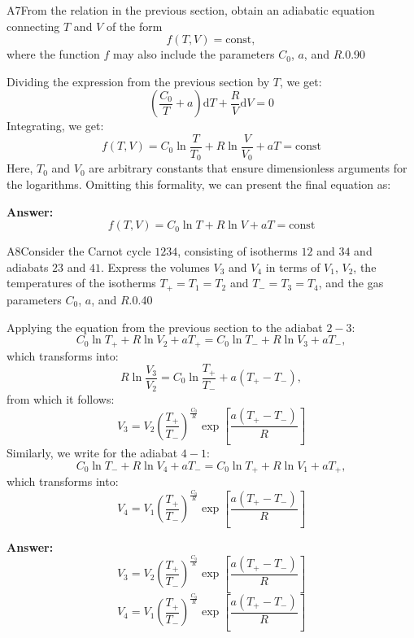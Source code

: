 \documentclass[11pt,a4paper]{article}
\begin{document}
\begin{solcard}{A7}{From the relation in the previous section, obtain an adiabatic equation connecting $T$ and $V$ of the form $$ f(T, V) = \mathrm{const}, $$where the function $f$ may also include the parameters $C_0$, $a$, and $R$.}{0.90}

Dividing the expression from the previous section by $T$, we get: \[\left(\dfrac{C_0}{T}+a\right)\mathrm dT+\dfrac{R}{V}\mathrm dV=0\]Integrating, we get: \[f(T, V)=C_0\ln\dfrac{T}{T_0}+R\ln\dfrac{V}{V_0}+aT=\mathrm{const}\]Here, $T_0$ and $V_0$ are arbitrary constants that ensure dimensionless arguments for the logarithms. Omitting this formality, we can present the final equation as:

\par\smallskip\noindent\textbf{Answer:} \[f(T, V)=C_0\ln T+R\ln V+aT=\mathrm{const}\]
\end{solcard}

\begin{solcard}{A8}{Consider the Carnot cycle $1234$, consisting of isotherms $12$ and $34$ and adiabats $23$ and $41$. Express the volumes $V_3$ and $V_4$ in terms of $V_1$, $V_2$, the temperatures of the isotherms $T_+ = T_1 = T_2$ and $T_- = T_3 = T_4$, and the gas parameters $C_0$, $a$, and $R$.}{0.40}

Applying the equation from the previous section to the adiabat $2-3$: \[C_0\ln T_++R\ln V_2+aT_+=C_0\ln T_-+R\ln V_3+aT_-,\]which transforms into: \[R\ln\dfrac{V_3}{V_2}=C_0\ln\dfrac{T_+}{T_-}+a(T_+-T_-),\]from which it follows: \[V_3=V_2\left(\dfrac{T_+}{T_-}\right)^\frac{C_0}{R}\exp\left[\dfrac{a(T_+-T_-)}{R}\right]\]Similarly, we write for the adiabat $4-1$: \[C_0\ln T_-+R\ln V_4+aT_-=C_0\ln T_++R\ln V_1+aT_+,\]which transforms into: \[V_4=V_1\left(\dfrac{T_+}{T_-}\right)^\frac{C_0}{R}\exp\left[\dfrac{a(T_+-T_-)}{R}\right]\]

\par\smallskip\noindent\textbf{Answer:} \[V_3=V_2\left(\dfrac{T_+}{T_-}\right)^\frac{C_0}{R}\exp\left[\dfrac{a(T_+-T_-)}{R}\right]\]\[V_4=V_1\left(\dfrac{T_+}{T_-}\right)^\frac{C_0}{R}\exp\left[\dfrac{a(T_+-T_-)}{R}\right]\]
\end{solcard}
\end{document}
